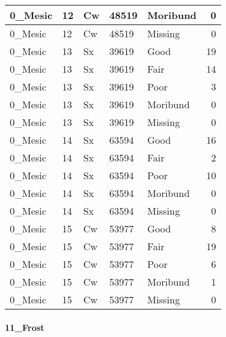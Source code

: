 \documentclass[
]{article}
\begin{document}
\begin{tabular}{l|l|l|l|l|r}
\hline
0\_Mesic & 12 & Cw & 48519 & Moribund & 0\\
\hline
0\_Mesic & 12 & Cw & 48519 & Missing & 0\\
\hline
0\_Mesic & 13 & Sx & 39619 & Good & 19\\
\hline
0\_Mesic & 13 & Sx & 39619 & Fair & 14\\
\hline
0\_Mesic & 13 & Sx & 39619 & Poor & 3\\
\hline
0\_Mesic & 13 & Sx & 39619 & Moribund & 0\\
\hline
0\_Mesic & 13 & Sx & 39619 & Missing & 0\\
\hline
0\_Mesic & 14 & Sx & 63594 & Good & 16\\
\hline
0\_Mesic & 14 & Sx & 63594 & Fair & 2\\
\hline
0\_Mesic & 14 & Sx & 63594 & Poor & 10\\
\hline
0\_Mesic & 14 & Sx & 63594 & Moribund & 0\\
\hline
0\_Mesic & 14 & Sx & 63594 & Missing & 0\\
\hline
0\_Mesic & 15 & Cw & 53977 & Good & 8\\
\hline
0\_Mesic & 15 & Cw & 53977 & Fair & 19\\
\hline
0\_Mesic & 15 & Cw & 53977 & Poor & 6\\
\hline
0\_Mesic & 15 & Cw & 53977 & Moribund & 1\\
\hline
0\_Mesic & 15 & Cw & 53977 & Missing & 0\\
\hline
\end{tabular}

\hypertarget{frost-1}{%
\paragraph{11\_Frost}\label{frost-1}}
\end{document}
